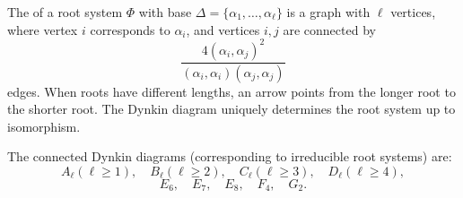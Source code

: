 The  of a root system $\Phi$ with base $\Delta = \{\alpha_1, \ldots, \alpha_\ell\}$ is a graph with $\ell$ vertices, where vertex $i$ corresponds to $\alpha_i$, and vertices $i, j$ are connected by
$$ \frac{4(\alpha_i, \alpha_j)^2}{(\alpha_i, \alpha_i)(\alpha_j, \alpha_j)} $$
edges. When roots have different lengths, an arrow points from the longer root to the shorter root. The Dynkin diagram uniquely determines the root system up to isomorphism.

The connected Dynkin diagrams (corresponding to irreducible root systems) are:
$$A_\ell (\ell \geq 1), \quad B_\ell (\ell \geq 2), \quad C_\ell (\ell \geq 3), \quad D_\ell (\ell \geq 4),$$
$$E_6, \quad E_7, \quad E_8, \quad F_4, \quad G_2.$$
